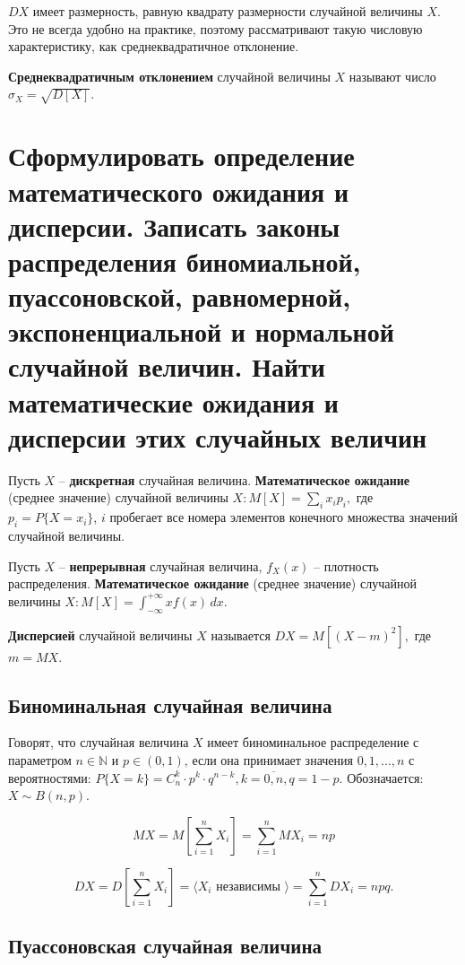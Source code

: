 $DX$ имеет размерность, равную квадрату размерности случайной величины $X$. Это не всегда удобно на практике, поэтому рассматривают такую числовую характеристику, как среднеквадратичное отклонение.

\textbf{Среднеквадратичным отклонением} случайной величины $X$ называют число $\sigma_X = \sqrt{D[X]}$. 

\section{Сформулировать определение математического ожидания и дисперсии. Записать законы распределения биномиальной, пуассоновской, равномерной, экспоненциальной и нормальной случайной величин. Найти математические ожидания и дисперсии этих случайных величин}

Пусть $X$ -- \textbf{дискретная} случайная величина. \textbf{Математическое ожидание} (среднее значение) случайной величины $X: M[X] = \sum_{i} x_ip_i,$ где $p_i = P\{X=x_i\}$, $i$ пробегает все номера элементов конечного множества значений случайной величины.

Пусть $X$ -- \textbf{непрерывная} случайная величина, $f_X(x)$ -- плотность распределения. \textbf{Математическое ожидание} (среднее значение) случайной величины $X: M[X] = \int_{-\infty}^{+\infty} xf(x)\, dx$.

\textbf{Дисперсией} случайной величины $X$ называется $DX = M[(X-m)^2],$ где $m=MX$.

\subsection*{Биноминальная случайная величина}

Говорят, что случайная величина $X$ имеет биноминальное распределение с параметром $n \in \mathbb{N}$ и $p \in (0, 1)$, если она принимает значения $0, 1, ..., n$ с вероятностями: $P\{X = k\} = C_n^k \cdot p^k \cdot q^{n-k}, k = \overline{0, n}, q = 1 - p.$ Обозначается: $X \sim B(n, p)$.

\[
MX = M[\sum_{i = 1}^{n} X_i] = \sum_{i = 1}^{n} MX_i = np
\]

\[
DX = D[\sum_{i = 1}^{n} X_i] = \langle X_i \text{ независимы } \rangle = \sum_{i = 1}^{n} DX_i = npq.
\]

\subsection*{Пуассоновская случайная величина}

